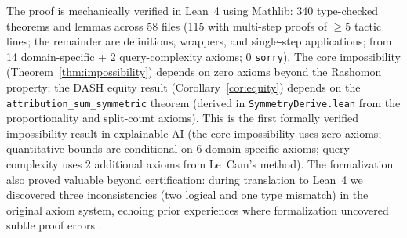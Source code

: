 \documentclass{article}
\begin{document}
\begin{sloppypar}
The proof is mechanically verified in Lean~4 using Mathlib: 340 type-checked theorems
and lemmas across 58 files (115 with multi-step proofs of ${\geq}5$ tactic lines; the
remainder are definitions, wrappers, and single-step applications; from 14
domain-specific + 2 query-complexity axioms; 0 \texttt{sorry}).
The core impossibility (Theorem~\ref{thm:impossibility}) depends on zero axioms
beyond the Rashomon property; the DASH equity result (Corollary~\ref{cor:equity})
depends on the \texttt{attribution\_sum\_symmetric} theorem (derived in
\texttt{SymmetryDerive.lean} from the proportionality and split-count axioms).
This is the first formally verified impossibility result in
explainable AI (the core impossibility uses zero axioms; quantitative bounds are
conditional on 6 domain-specific axioms; query complexity uses 2 additional axioms
from Le~Cam's method).
The formalization also proved valuable beyond certification: during translation to
Lean~4 we discovered three inconsistencies (two logical and one type mismatch) in the
original axiom system, echoing prior experiences where formalization uncovered subtle
proof errors \citep{nipkow2009social,zhang2026statistical}.
\end{sloppypar}
\end{document}
